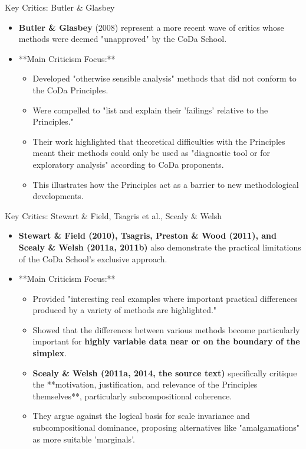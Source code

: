 \begin{frame}{Key Critics: Butler \& Glasbey}
\scriptsize   %

    \begin{itemize}
        \item \textbf{Butler \& Glasbey} (2008) represent a more recent wave of critics whose methods were deemed "unapproved" by the CoDa School.
        \item **Main Criticism Focus:**
        \begin{itemize}
            \item Developed "otherwise sensible analysis" methods that did not conform to the CoDa Principles.
            \item Were compelled to "list and explain their 'failings' relative to the Principles."
            \item Their work highlighted that theoretical difficulties with the Principles meant their methods could only be used as "diagnostic tool or for exploratory analysis" according to CoDa proponents.
            \item This illustrates how the Principles act as a barrier to new methodological developments.
        \end{itemize}
    \end{itemize}
\end{frame}
\begin{frame}{Key Critics: Stewart \& Field, Tsagris et al., Scealy \& Welsh}
\scriptsize   %

    \begin{itemize}
        \item \textbf{Stewart \& Field (2010), Tsagris, Preston \& Wood (2011), and Scealy \& Welsh (2011a, 2011b)} also demonstrate the practical limitations of the CoDa School's exclusive approach.
        \item **Main Criticism Focus:**
        \begin{itemize}
            \item Provided "interesting real examples where important practical differences produced by a variety of methods are highlighted."
            \item Showed that the differences between various methods become particularly important for \textbf{highly variable data near or on the boundary of the simplex}.
            \item \textbf{Scealy & Welsh (2011a, 2014, the source text)} specifically critique the **motivation, justification, and relevance of the Principles themselves**, particularly subcompositional coherence.
            \item They argue against the logical basis for scale invariance and subcompositional dominance, proposing alternatives like "amalgamations" as more suitable 'marginals'.
        \end{itemize}
    \end{itemize}
\end{frame}
